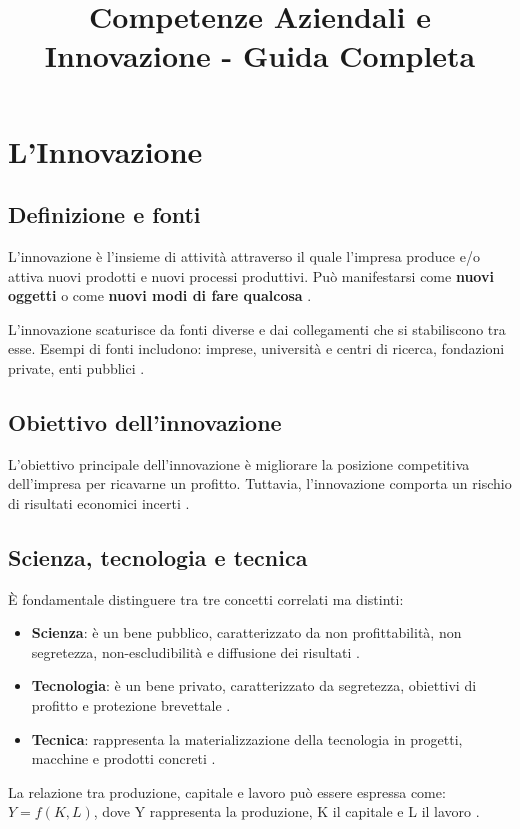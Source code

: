 \documentclass[12pt,a4paper]{article}
\title{Competenze Aziendali e Innovazione - Guida Completa}
\author{}
\date{}
\begin{document}
\maketitle


\section{L'Innovazione}

\subsection{Definizione e fonti}
L'innovazione è l'insieme di attività attraverso il quale l'impresa produce e/o attiva nuovi prodotti e nuovi processi produttivi. Può manifestarsi come \textbf{nuovi oggetti} o come \textbf{nuovi modi di fare qualcosa} .

L'innovazione scaturisce da fonti diverse e dai collegamenti che si stabiliscono tra esse. Esempi di fonti includono: imprese, università e centri di ricerca, fondazioni private, enti pubblici .

\subsection{Obiettivo dell'innovazione}
L'obiettivo principale dell'innovazione è migliorare la posizione competitiva dell'impresa per ricavarne un profitto. Tuttavia, l'innovazione comporta un rischio di risultati economici incerti .

\subsection{Scienza, tecnologia e tecnica}
È fondamentale distinguere tra tre concetti correlati ma distinti:

\begin{itemize}
    \item \textbf{Scienza}: è un bene pubblico, caratterizzato da non profittabilità, non segretezza, non-escludibilità e diffusione dei risultati .
    \item \textbf{Tecnologia}: è un bene privato, caratterizzato da segretezza, obiettivi di profitto e protezione brevettale .
    \item \textbf{Tecnica}: rappresenta la materializzazione della tecnologia in progetti, macchine e prodotti concreti .
\end{itemize}

La relazione tra produzione, capitale e lavoro può essere espressa come: \(Y = f(K, L)\), dove Y rappresenta la produzione, K il capitale e L il lavoro .
\end{document}

